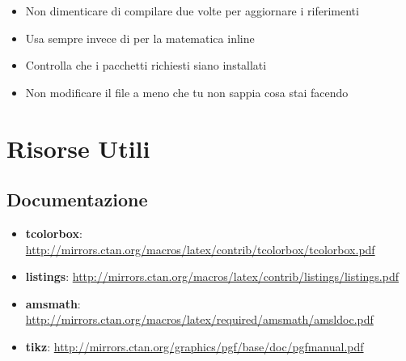 \documentclass{csnotes}
\begin{document}
\begin{warning}
\begin{itemize}
    \item Non dimenticare di compilare due volte per aggiornare i riferimenti
    \item Usa sempre  invece di 
     per la matematica inline
    \item Controlla che i pacchetti richiesti siano installati
    \item Non modificare il file  a meno che tu non sappia 
    cosa stai facendo
\end{itemize}
\end{warning}


\section{Risorse Utili}

\subsection{Documentazione}

\begin{itemize}
    \item \textbf{tcolorbox}: \url{http://mirrors.ctan.org/macros/latex/contrib/tcolorbox/tcolorbox.pdf}
    \item \textbf{listings}: \url{http://mirrors.ctan.org/macros/latex/contrib/listings/listings.pdf}
    \item \textbf{amsmath}: \url{http://mirrors.ctan.org/macros/latex/required/amsmath/amsldoc.pdf}
    \item \textbf{tikz}: \url{http://mirrors.ctan.org/graphics/pgf/base/doc/pgfmanual.pdf}
\end{itemize}

\end{document}

